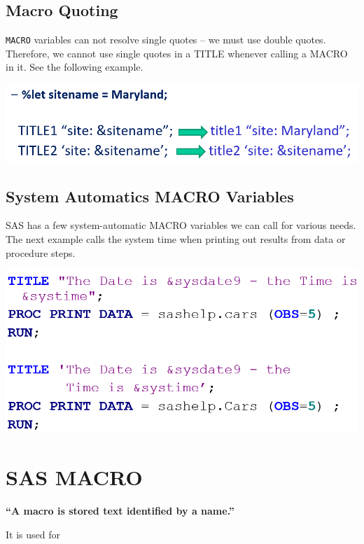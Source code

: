 \documentclass[
]{book}
\begin{document}
\hypertarget{macro-quoting}{%
\subsection{Macro Quoting}\label{macro-quoting}}

\texttt{MACRO} variables can not resolve single quotes -- we must use double quotes. Therefore, we cannot use single quotes in a TITLE whenever calling a MACRO in it. See the following example.

\begin{center}\includegraphics[width=0.8\linewidth]{img14/w14-MACROinTITLE} \end{center}

\hypertarget{system-automatics-macro-variables}{%
\subsection{System Automatics MACRO Variables}\label{system-automatics-macro-variables}}

SAS has a few system-automatic MACRO variables we can call for various needs. The next example calls the system time when printing out results from data or procedure steps.

\begin{center}\includegraphics[width=0.7\linewidth]{img14/w14-CallingAutomaticMacroVar} \end{center}

\hypertarget{sas-macro}{%
\section{SAS MACRO}\label{sas-macro}}

\textbf{``A macro is stored text identified by a name.''}

It is used for
\end{document}

